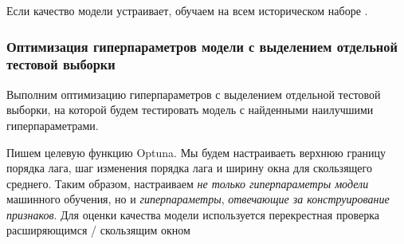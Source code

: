 \documentclass[%
	11pt,
	a4paper,
	utf8,
		]{article}
\begin{document}
Если качество модели устраивает, обучаем на всем историческом наборе \cite[]{gruzdev:time-series-2022}.

\subsubsection{Оптимизация гиперпараметров модели с выделением отдельной тестовой выборки}

Выполним оптимизацию гиперпараметров с выделением отдельной тестовой выборки, на которой будем тестировать модель с найденными наилучшими гиперпараметрами.

Пишем целевую функцию Optuna. Мы будем настраиваеть верхнюю границу порядка лага, шаг изменения порядка лага и ширину окна для скользящего среднего. Таким образом, настраиваем \emph{не только гиперпараметры модели} машинного обучения, но и \emph{гиперпараметры}, \emph{отвечающие за конструирование признаков}. Для оценки качества модели используется перекрестная проверка расширяющимся / скользящим окном
\end{document}
